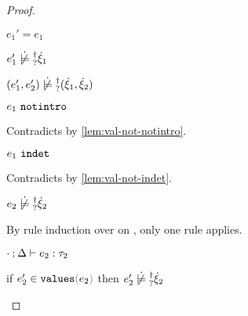 \begin{proof}
\begin{byCases}
\begin{byCases}
\begin{byCases}
\begin{byCases}
\begin{byCases}
\begin{byCases}
              \begin{pfsteps*}
              \item $e_1'=e_1$  
              \item $\cnotsatisfyormay{e_1'}{\hxi_1}$  
              \item $\cnotsatisfyormay{\hpair{e_1'}{e_2'}}{\cpair{\hxi_1}{\hxi_2}}$ 
              \end{pfsteps*} 
              \item[\text{(\ref{rule:IVIndet})}]
              \begin{pfsteps*}
              \item $e_1 ~\mathtt{notintro}$ 
              \end{pfsteps*} 
              Contradicts  by \autoref{lem:val-not-notintro}.
              \item[\text{(\ref{rule:IVInl}), (\ref{rule:IVInr}), (\ref{rule:IVPair})}]
              \begin{pfsteps*}
              \item $e_1 ~\mathtt{indet}$ 
              \end{pfsteps*} 
              Contradicts  by \autoref{lem:val-not-indet}.
            \end{byCases}
          \end{byCases}
          \item[\cnotsatisfyormay{e_2}{\hxi_2}]
          \begin{pfsteps*}
          \item $\cnotsatisfyormay{e_2}{\hxi_2}$  
          \end{pfsteps*}
          By rule induction over  on , only one rule applies.
          \begin{byCases}
            \item[\text{(\ref{rule:TPair})}]
            \begin{pfsteps*}
            \item $\cdot \mathbin{;} \Delta \vdash e_2 : \tau_2$  
            \item if $\inValues{e_2'}{e_2}$ then $\cnotsatisfyormay{e_2'}{\hxi_2}$  

\end{pfsteps*}
\end{byCases}
\end{byCases}
\end{byCases}
\end{byCases}
\end{byCases}
\end{proof}

